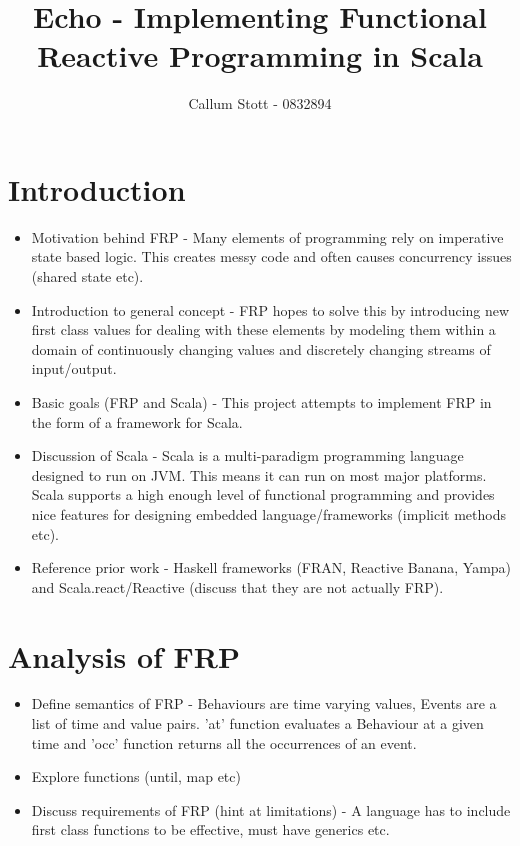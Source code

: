 \documentclass{article}
\begin{document}
  \title{Echo - Implementing Functional Reactive Programming in Scala}
  \author{Callum Stott - 0832894}
  \maketitle
  \newpage
  \twocolumn
  \section{Introduction}
   \begin{itemize}
     \item Motivation behind FRP -
      Many elements of programming rely on imperative state based logic. This creates
      messy code and often causes concurrency issues (shared state etc).
     \item Introduction to general concept - 
     FRP hopes to solve this by introducing new first class values for dealing with
     these elements by modeling them within a domain of continuously changing values
     and discretely changing streams of input/output.
     \item Basic goals (FRP and Scala) - 
     This project attempts to implement FRP in the form of a framework for Scala.
     \item Discussion of Scala - 
     Scala is a multi-paradigm programming language designed to run on JVM. This 
     means it can run on most major platforms. Scala supports a high enough level
     of functional programming and provides nice features for designing embedded
     language/frameworks (implicit methods etc).
     \item Reference prior work - 
     Haskell frameworks (FRAN, Reactive Banana, Yampa) and Scala.react/Reactive
     (discuss that they are not actually FRP).
   \end{itemize}
  \section{Analysis of FRP}
    \begin{itemize}
      \item Define semantics of FRP - 
      Behaviours are time varying values, Events are a list of time and value pairs.
      'at' function evaluates a Behaviour at a given time and 'occ' function returns 
      all the occurrences of an event.
      \item Explore functions (until, map etc)
      \item Discuss requirements of FRP (hint at limitations) - 
      A language has to include first class functions to be effective, must have
      generics etc.
    \end{itemize}
\end{document}
